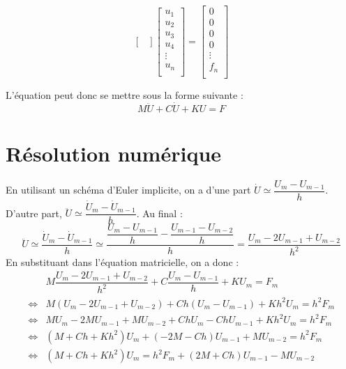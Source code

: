 \documentclass[10pt,fleqn]{article} %
\begin{document}
$$\begin{bmatrix}
\end{bmatrix}
\begin{bmatrix}
{u}_1\\
{u}_2\\
{u}_3\\
{u}_4\\
\vdots\\
{u}_n\\
\end{bmatrix} 
=
\begin{bmatrix}
0\\
0\\
0\\
0\\
\vdots\\
{f}_n\\
\end{bmatrix} 
$$

L'équation peut donc se mettre sous la forme suivante :
$$
M \ddot{U} + C \dot{U}+ K U = F 
$$

\section{Résolution numérique}

En utilisant un schéma d'Euler implicite, on a d'une part 
$\dot{U} \simeq \dfrac{U_{m}-U_{m-1}}{h} $. D'autre part, 
$\ddot{U} \simeq \dfrac{\dot{U}_{m}-\dot{U}_{m-1}}{h}$. Au final : 
$$
\ddot{U} \simeq \dfrac{\dot{U}_{m}-\dot{U}_{m-1}}{h}
\simeq \dfrac{ \dfrac{U_{m}-U_{m-1}}{h}- \dfrac{U_{m-1}-U_{m-2}}{h}}{h}
= \dfrac{ U_{m}-2U_{m-1}+U_{m-2}}{h^2}
$$
En substituant dans l'équation matricielle, on a donc : 
\begin{eqnarray*}
&M \dfrac{ U_{m}-2U_{m-1}+U_{m-2}}{h^2} + C \dfrac{U_{m}-U_{m-1}}{h} + K U_m = F _m \\
\Longleftrightarrow & 
M \left( U_{m}-2U_{m-1}+U_{m-2}\right) + Ch \left(U_{m}-U_{m-1}\right) 
+ K h^2 U_m = h^2 F_m \\
\Longleftrightarrow & 
M  U_{m}-2M U_{m-1}+M U_{m-2} + Ch U_{m}-Ch U_{m-1}
+ K h^2 U_m = h^2 F_m \\
\Longleftrightarrow & 
\left( M + Ch  + K h^2 \right)  U_m 
+ \left(-2M  -Ch  \right)U_{m-1}
+M U_{m-2} 
= h^2 F_m \\
\Longleftrightarrow & 
\left( M + Ch  + K h^2 \right)  U_m 
= h^2 F_m + \left(2M  +Ch  \right)U_{m-1} - M U_{m-2}  \\
\end{eqnarray*}

\else
\fi
\end{document}
